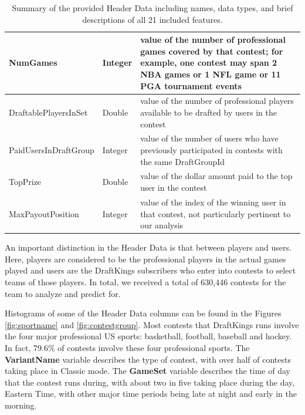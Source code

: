 \begin{table}
\begin{tabular}{|p{5cm}|p{1.6cm}|p{9.5cm}|}
    \hline
    NumGames & Integer & value of the number of professional games covered by that contest; for example, one contest may span 2 NBA games or 1 NFL game or 11 PGA tournament events \\
    \hline
    DraftablePlayersInSet & Double & value of the number of professional players available to be drafted by users in the contest \\
    \hline
    PaidUsersInDraftGroup & Integer & value of the number of users who have previously participated in contests with the same DraftGroupId\\
    \hline
    TopPrize & Double & value of the dollar amount paid to the top user in the contest \\
    \hline
    MaxPayoutPosition & Integer & value of the index of the winning user in that contest, not particularly pertinent to our analysis \\
    \hline
\end{tabular}
\caption[Header Data Column Descriptions]{Summary of the provided Header Data including names, data types, and brief descriptions of all 21 included features.}
\label{tab:headercols}
\end{table}

An important distinction in the Header Data is that between players and users. Here, players are considered to be the professional players in the actual games played and users are the DraftKings subscribers who enter into contests to select teams of those players. In total, we received a total of 630,446 contests for the team to analyze and predict for.

Histograms of some of the Header Data columns can be found in the Figures \ref{fig:sportname} and \ref{fig:contestgroup}. Most contests that DraftKings runs involve the four major professional US sports: basketball, football, baseball and hockey. In fact, 79.6\% of contests involve these four professional sports. The \textbf{VariantName} variable describes the type of contest, with over half of contests taking place in Classic mode. The \textbf{GameSet} variable describes the time of day that the contest runs during, with about two in five taking place during the day, Eastern Time, with other major time periods being late at night and early in the morning. 

